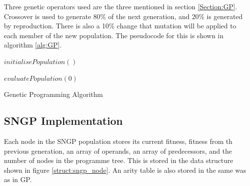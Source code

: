 \documentclass{article}
\begin{document}
		Three genetic operators used are the three mentioned in section \ref{Section:GP}. Crossover is used to generate 80\% of the next generation, and 20\% is generated by reproduction. There is also a 10\% change that mutation will be applied to each member of the new population. The pseudocode for this is shown in algorithm \ref{alg:GP}.
		
		\begin{algorithm}[H]
			
			$initialisePopulation()$
			
			$evaluatePopulation(0)$
			
		
				
			\caption{Genetic Programming Algorithm}
			
			\label{alg:GP}
		\end{algorithm}
		
		\subsection{SNGP Implementation}
		
			Each node in the SNGP population stores its current fitness, fitness from th previous generation, an array of operands, an array of predecessors, and the number of nodes in the programme tree. This is stored in the data structure shown in figure \ref{struct:sngp_node}. An arity table is also stored in the same was as in GP.
			
\end{document}

